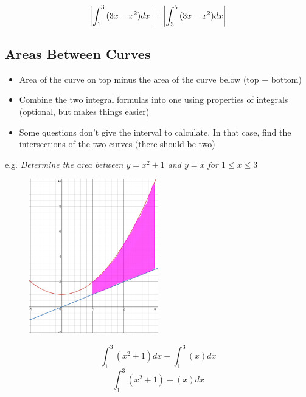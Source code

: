 \documentclass[a4paper,12pt]{article}
\begin{document}
$$\abs{\int^3_1{(3x - x^2)}dx} + \abs{\int^5_3{(3x - x^2)}dx}$$

\pagebreak

\subsection{Areas Between Curves}
\begin{itemize}
    \item{Area of the curve on top minus the area of the curve below (top $-$ bottom)}
    \item{Combine the two integral formulas into one using properties of integrals (optional, but makes things easier)}
    \item{Some questions don't give the interval to calculate. In that case, find the intersections of the two curves (there should be two)}
\end{itemize}

e.g. \emph{Determine the area between $y = x^2 + 1$ and $y = x$ for $1 \leq x \leq 3$}
\begin{figure}[H]
    \centering
    \includegraphics[width=0.50\textwidth]{between}
\end{figure}

$$\int^3_1{(x^2 + 1)}dx - \int^3_1{(x)}dx$$
$$\int^3_1{(x^2 + 1) - (x)}dx$$

\pagebreak
\end{document}
